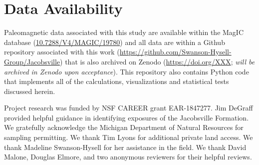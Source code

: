 \documentclass[draft]{agujournal2019}
\begin{document}
\section*{Data Availability}
Paleomagnetic data associated with this study are available within the MagIC database (\url{10.7288/V4/MAGIC/19780}) and all data are within a Github repository associated with this work (\url{https://github.com/Swanson-Hysell-Group/Jacobsville}) that is also archived on Zenodo (\url{https://doi.org/XXX}; \textit{will be archived in Zenodo upon acceptance}). This repository also contains Python code that implements all of the calculations, visualizations and statistical tests discussed herein. 

\acknowledgments
Project research was funded by NSF CAREER grant EAR-1847277. Jim DeGraff provided helpful guidance in identifying exposures of the Jacobsville Formation. We gratefully acknowledge the Michigan Department of Natural Resources for sampling permitting. We thank Tim Lyons for additional private land access. We thank Madeline Swanson-Hysell for her assistance in the field. We thank David Malone, Douglas Elmore, and two anonymous reviewers for their helpful reviews. 

\nocite{Swanson-Hysell2014a, Swanson-Hysell2014b, Books1968a, Books1972a, Davis1997a, Davis1985a, Denyszyn2009a, Diehl1994a, Eyster2019a, Fairchild2017a, Halls1974a, Hnat2006a, Palmer1986a, Tauxe2009a, Tauxe1991a, Weil2003a, Zhang2023b, Zhang2023c, Zhang2023d, Tauxe1994a, McFadden1990a, Torsvik2012a, Brown2012a, Henry1977a, Buchan1976a, Warnock2000a, Brown2012a, Denyszyn2009a, Eyster2019a, Weil2003a, Slotznick2023a, Hodgin2022a}

\end{document}
